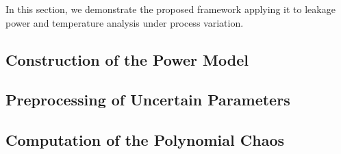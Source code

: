 In this section, we demonstrate the proposed framework applying it to leakage power and temperature analysis under process variation.

\subsection{Construction of the Power Model} 


\subsection{Preprocessing of Uncertain Parameters} 


\subsection{Computation of the Polynomial Chaos} 

